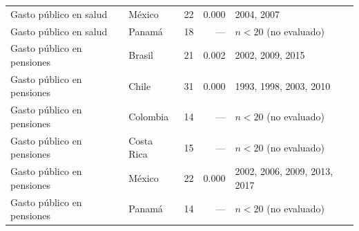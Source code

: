 \begin{tabular}{llrrl}
Gasto público en salud & México & 22 & 0.000 & 2004, 2007 \\
Gasto público en salud & Panamá & 18 & --- & $n<20$ (no evaluado) \\
Gasto público en pensiones & Brasil & 21 & 0.002 & 2002, 2009, 2015 \\
Gasto público en pensiones & Chile & 31 & 0.000 & 1993, 1998, 2003, 2010 \\
Gasto público en pensiones & Colombia & 14 & --- & $n<20$ (no evaluado) \\
Gasto público en pensiones & Costa Rica & 15 & --- & $n<20$ (no evaluado) \\
Gasto público en pensiones & México & 22 & 0.000 & 2002, 2006, 2009, 2013, 2017 \\
Gasto público en pensiones & Panamá & 14 & --- & $n<20$ (no evaluado) \\
\bottomrule
\end{tabular}

